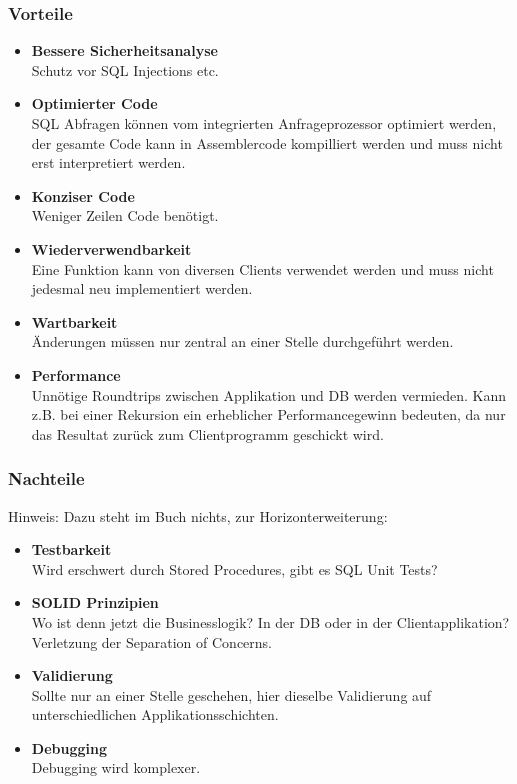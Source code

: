 \subsubsection{Vorteile}
\begin{itemize}
    \item \textbf{Bessere Sicherheitsanalyse} \\
        Schutz vor SQL Injections etc.
    \item \textbf{Optimierter Code} \\
        SQL Abfragen können vom integrierten Anfrageprozessor optimiert werden, der gesamte Code kann in Assemblercode kompilliert werden und muss nicht erst interpretiert werden.
    \item \textbf{Konziser Code} \\
        Weniger Zeilen Code benötigt.
    \item \textbf{Wiederverwendbarkeit} \\
        Eine Funktion kann von diversen Clients verwendet werden und muss nicht jedesmal neu implementiert werden.
    \item \textbf{Wartbarkeit} \\
        Änderungen müssen nur zentral an einer Stelle durchgeführt werden.
    \item \textbf{Performance} \\
        Unnötige Roundtrips zwischen Applikation und DB werden vermieden. Kann z.B. bei einer Rekursion ein erheblicher Performancegewinn bedeuten, da nur das Resultat zurück zum Clientprogramm geschickt wird.    
\end{itemize}

\subsubsection{Nachteile}

Hinweis: Dazu steht im Buch nichts, zur Horizonterweiterung:

\begin{itemize}
    \item \textbf{Testbarkeit} \\
    Wird erschwert durch Stored Procedures, gibt es SQL Unit Tests?
    \item \textbf{SOLID Prinzipien} \\
    Wo ist denn jetzt die Businesslogik? In der DB oder in der Clientapplikation? Verletzung der Separation of Concerns.
    \item \textbf{Validierung} \\
    Sollte nur an einer Stelle geschehen, hier dieselbe Validierung auf unterschiedlichen Applikationsschichten.
    \item \textbf{Debugging} \\
    Debugging wird komplexer.
\end{itemize}

